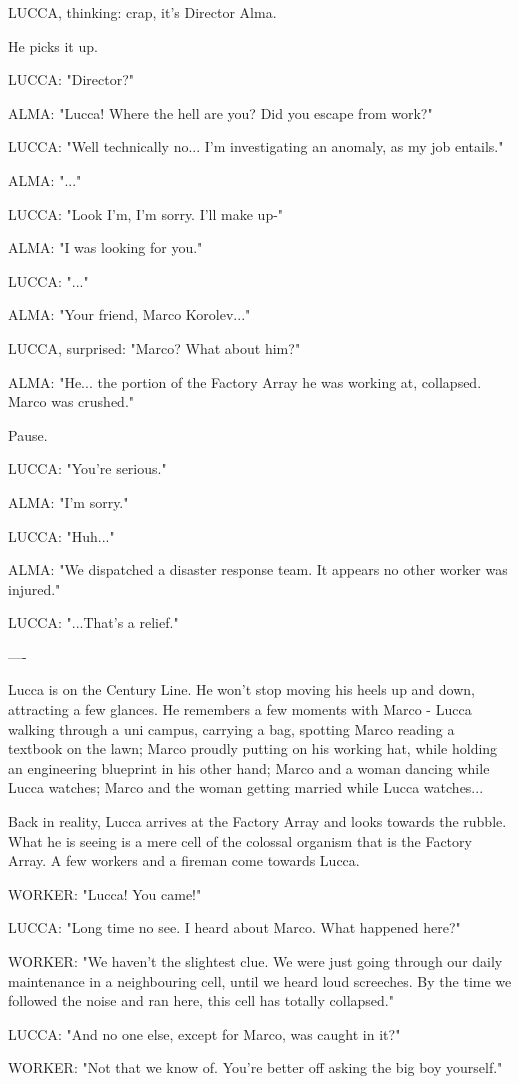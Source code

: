 \documentclass[11pt]{article}
\begin{document}
LUCCA, thinking: crap, it's Director Alma.

He picks it up.

LUCCA: "Director?"

ALMA: "Lucca! Where the hell are you? Did you escape from work?"

LUCCA: "Well technically no... I'm investigating an anomaly, as my job entails."

ALMA: "..."

LUCCA: "Look I'm, I'm sorry. I'll make up-"

ALMA: "I was looking for you."

LUCCA: "..."

ALMA: "Your friend, Marco Korolev..."

LUCCA, surprised: "Marco? What about him?"

ALMA: "He... the portion of the Factory Array he was working at, collapsed. Marco was crushed."

Pause.

LUCCA: "You're serious."

ALMA: "I'm sorry."

LUCCA: "Huh..."

ALMA: "We dispatched a disaster response team. It appears no other worker was injured."

LUCCA: "...That's a relief."

----

Lucca is on the Century Line. He won't stop moving his heels up and down, attracting a few glances. He remembers a few moments with Marco - Lucca walking through a uni campus, carrying a bag, spotting Marco reading a textbook on the lawn; Marco proudly putting on his working hat, while holding an engineering blueprint in his other hand; Marco and a woman dancing while Lucca watches; Marco and the woman getting married while Lucca watches...

Back in reality, Lucca arrives at the Factory Array and looks towards the rubble. What he is seeing is a mere cell of the colossal organism that is the Factory Array. A few workers and a fireman come towards Lucca.

WORKER: "Lucca! You came!"

LUCCA: "Long time no see. I heard about Marco. What happened here?"

WORKER: "We haven't the slightest clue. We were just going through our daily maintenance in a neighbouring cell, until we heard loud screeches. By the time we followed the noise and ran here, this cell has totally collapsed."

LUCCA: "And no one else, except for Marco, was caught in it?"

WORKER: "Not that we know of. You're better off asking the big boy yourself."
\end{document}
